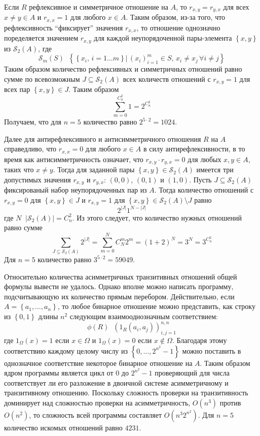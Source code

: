 \documentclass[a4paper]{article}
\newcommand{\obj}[1]{\left\{ #1 \right \}}
\newcommand{\brac}[1]{\left ( #1 \right )}
\newcommand{\induc}[1]{\left . #1 \right \vert}
\newcommand{\abs}[1]{\left | #1 \right |}
\newcommand{\Scal}{\mathcal{S}}
\newcommand{\defn}{\mathop{\overset{\Delta}{=}}\nolimits}
\begin{document}
Если $R$ рефлексивное и симметричное отношение на $A$, то $r_{x,y} = r_{y,x}$ для всех $x\neq y\in A$ и $r_{x,x}=1$ для любого $x\in A$. Таким образом, из-за того, что рефлексивность ``фиксирует'' значения $r_{x,x}$, то отношение однозначно поределяется значением $r_{x,y}$ для каждой неупорядоченной пары-элемента $\obj{x,y}$ из $\Scal_2(A)$, где \[\Scal_m(S)\defn \obj{ \induc{\obj{x_i,\,i=1\ldots m}}\, \brac{x_i}_{i=1}^m\in S,\,x_i\neq x_j\,\forall i\neq j }\] Таким образом количество рефлексивных и симметричных отношений равно сумме по всевозможным $J\subseteq \Scal_2(A)$ всех количеств отношений с $r_{x,y}=1$ для всех пар $\obj{x,y}\in J$. Таким образом \[\sum_{m=0}^{C^2_n} 1 = 2^{C^2_n}\] Получаем, что для $n=5$ количество равно $2^{5 \cdot 2} = 1024$.

Далее для антирефлексивного и антисимметричного отношения $R$ на $A$ справедливо, что $r_{x,x}=0$ для любого $x\in A$ в силу антирефлексивности, в то время как антисимметричность означает, что $r_{x,y}\cdot r_{y,x}=0$ для любых $x,y\in A$, таких что $x\neq y$. Тогда для заданной пары $\obj{x,y}\in \Scal_2(A)$ имеется три допустимых значения $r_{x,y}$ и $r_{y,x}$: $(0,0)$, $(0,1)$ и $(1,0)$. Пусть $J\subseteq \Scal_2(A)$ фиксированый набор неупорядоченных пар из $A$. Тогда количество отношений с $r_{x,y}=0$ для $\obj{x,y}\in J$ и $r_{x,y}=1$ для $\obj{x,y}\in {\Scal_2(A)}\setminus J$ равно \[ 2 ^{\abs{J}} 1^{N-\abs{J}} \] где $N\defn \abs{\Scal_2(A)} = C^2_n$. Из этого следует, что количество нужных отношений равно сумме \[\sum_{J\subseteq \Scal_2(A)} 2 ^{\abs{J}} = \sum_{m=0}^N C^m_N 2^m = \brac{1+2}^N = 3^N = 3^{C^2_n} \] Для $n=5$ количество равно $3^{5\cdot 2} = 59049$.

Относительно количества асимметричных транзитивных отношений общей формулы вывести не удалось. Однако вполне можно написать программу, подсчитывающую их количество прямым перебором. Действительно, если $A=\obj{a_1,\ldots, a_n }$, то любое бинарное отношение можно представить, как строку из $\obj{0,1}$ длины $n^2$ следующим взаимооднозначным соответствием: \[\phi\brac{R}\defn \brac{1_R\brac{a_i,a_j} }_{i,j=1}^{n,n}\] где $1_\Omega(x) = 1$ если $x\in \Omega$ и $1_\Omega(x) = 0$ если $x\notin \Omega$. Благодаря этому соответствию каждому целому числу из $\obj{0,\ldots,2^{n^2}-1}$ можно поставить в однозначное соответствие некоторое бинарное отношение на $A$. Таким образом ядром программы является цикл от $0$ до $2^{n^2}-1$ проверяющий для числа соответствует ли его разложение в двоичной системе асимметричному и транзитивному отношению. Поскольку сложность проверки на транзитивность доминирует над сложностью проверки на асимметричность, $O(n^3)$ против $O(n^2)$, то сложность всей программы составляет $O(n^3 2^{n^2})$. Для $n=5$ количество искомых отношений равно $4231$.
\end{document}
